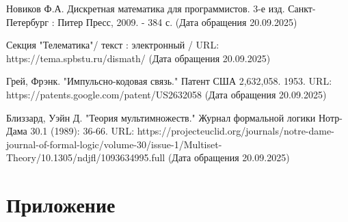 \documentclass[12pt,a4paper]{article}
\begin{document}
\begin{thebibliography}{9}






 Новиков Ф.А. Дискретная математика для программистов. 3-е изд. Санкт-Петербург : Питер Пресс, 2009. - 384 с. (Дата обращения 20.09.2025)

 Секция "Телематика"/ текст : электронный / URL: https://tema.spbstu.ru/dismath/ (Дата обращения 20.09.2025)

 Грей, Фрэнк. "Импульсно-кодовая связь." Патент США 2,632,058. 1953. URL: https://patents.google.com/patent/US2632058 (Дата обращения 20.09.2025)

 Близзард, Уэйн Д. "Теория мультимножеств." Журнал формальной логики Нотр-Дама 30.1 (1989): 36-66. URL: https://projecteuclid.org/journals/notre-dame-journal-of-formal-logic/volume-30/issue-1/Multiset-Theory/10.1305/ndjfl/1093634995.full (Дата обращения 20.09.2025)




\end{thebibliography}

\newpage
\appendix
\section*{Приложение}
\end{document}
